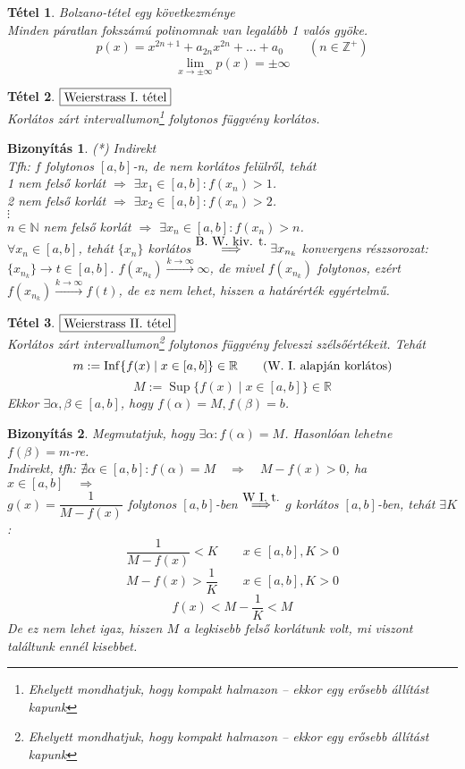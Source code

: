 \documentclass[a4paper,12pt,twoside]{book}
\DeclareMathOperator{\Inf}{Inf}
\DeclareMathOperator{\Sup}{Sup}
\newtheorem{tetel}{Tétel}[chapter]
\theoremstyle{break}
\newtheorem{biz}{Bizonyítás}[chapter]
\theoremstyle{plain}
\begin{document}
\begin{tetel} Bolzano-tétel egy következménye\\
 Minden páratlan fokszámú polinomnak van legalább 1 valós gyöke. 
 \[p(x) = x^{2n+1} + a_{2n}x^{2n}+\ldots+a_0 \qquad (n\in\mathbb{Z^+})\]
 \[\lim_{x\to\pm\infty} p(x) = \pm\infty\]
\end{tetel}
\addtocounter{biz}{1} %

\begin{tetel}\label{W.I}$\boxed{$Weierstrass I. tétel$}$\\
 Korlátos zárt intervallumon\footnote{Ehelyett mondhatjuk, hogy \emph{kompakt halmazon} -- ekkor egy erősebb állítást kapunk} folytonos függvény korlátos.
\end{tetel}
\begin{biz}(*) Indirekt\\
 Tfh: $f$ folytonos $[a, b]$-n, de nem korlátos felülről, tehát \\
  1 nem felső korlát $\Rightarrow$ $\exists x_1\in[a, b] : f(x_n)>1$.\\
  2 nem felső korlát $\Rightarrow$ $\exists x_2\in[a, b] : f(x_n)>2$.\\
  $\vdots$\\
  $n\in\mathbb{N}$ nem felső korlát $\Rightarrow$ $\exists x_n\in[a, b] : f(x_n)>n$.\\
 $\forall x_n \in [a,b]$, tehát $\{x_n\}$ korlátos $\overset{\hbox{B. W. kiv. t.}}{\Longrightarrow} \exists x_{n_k}$ konvergens részsorozat: $\{x_{n_k}\} \to t\in[a, b]$. $f(x_{n_k}) \xrightarrow{k\to \infty} \infty$, de mivel $f(x_{n_k})$ folytonos, ezért $f(x_{n_k}) \xrightarrow{k\to \infty} f(t)$, de ez nem lehet, hiszen a határérték egyértelmű. \blitza
\end{biz}

\begin{tetel}\label{W.II}$\boxed{$Weierstrass II. tétel$}$\\
 Korlátos zárt intervallumon\footnote{Ehelyett mondhatjuk, hogy \emph{kompakt halmazon} -- ekkor egy erősebb állítást kapunk} folytonos függvény felveszi szélsőértékeit. Tehát
 \[m := \Inf\{f(x)\;|\;x\in[a,b]\} \in \mathbb{R} \qquad (\hbox{W. I. alapján korlátos})\]
 \[M := \Sup\{f(x)\;|\;x\in[a,b]\} \in \mathbb{R}\]
Ekkor $\exists \alpha, \beta\in[a,b]$, hogy $f(\alpha)=M, f(\beta)=b$.
\end{tetel}
\begin{biz} Megmutatjuk, hogy $\exists \alpha: f(\alpha)=M$. Hasonlóan lehetne $f(\beta)=m$-re.\\
Indirekt, tfh: $\nexists \alpha\in[a,b]: f(\alpha) = M \quad \Rightarrow \quad M-f(x)>0$, ha $x\in[a,b] \quad \Rightarrow$\\
$g(x) = \dfrac{1}{M-f(x)}$ folytonos $[a,b]$-ben $\overset{\hbox{W I. t.}}{\Longrightarrow}$ $g$ korlátos $[a,b]$-ben, tehát $\exists K$:
\[\frac{1}{M-f(x)} < K \qquad x\in[a, b], K>0\]
\[M-f(x) > \frac{1}{K} \qquad x\in[a, b], K>0\]
\[f(x) < M-\frac{1}{K} < M\]
De ez nem lehet igaz, hiszen $M$ a legkisebb felső korlátunk volt, mi viszont találtunk ennél kisebbet.
\end{biz}
\end{document}

